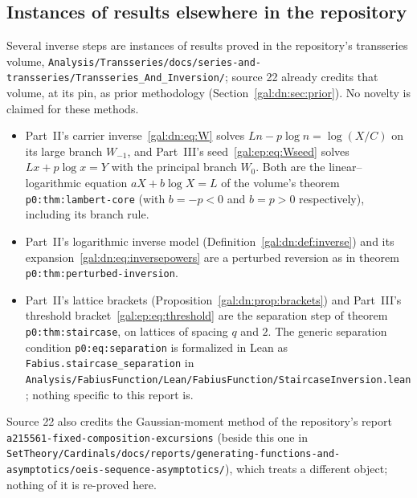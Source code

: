 \documentclass[11pt,letterpaper]{article}
\numberwithin{equation}{section}
\theoremstyle{definition}\newtheorem{definition}[theorem]{Definition}
\theoremstyle{remark}\newtheorem{remark}[theorem]{Remark}
\newcommand{\repopath}[1]{\nolinkurl{#1}}
\begin{document}
\subsection*{Instances of results elsewhere in the repository}
\label{gal:guide:lambert}
Several inverse steps are instances of results proved in the repository's transseries volume, \repopath{Analysis/Transseries/docs/series-and-transseries/Transseries_And_Inversion/}; source 22 already credits that volume, at its pin, as prior methodology (Section~\ref{gal:dn:sec:prior}). No novelty is claimed for these methods.
\begin{itemize}
\item Part~II's carrier inverse~\eqref{gal:dn:eq:W} solves $Ln-p\log n=\log(X/C)$ on its large branch $W_{-1}$, and Part~III's seed~\eqref{gal:ep:eq:Wseed} solves $Lx+p\log x=Y$ with the principal branch $W_0$. Both are the linear--logarithmic equation $aX+b\log X=L$ of the volume's theorem \texttt{p0:thm:lambert-core} (with $b=-p<0$ and $b=p>0$ respectively), including its branch rule.
\item Part~II's logarithmic inverse model (Definition~\ref{gal:dn:def:inverse}) and its expansion~\eqref{gal:dn:eq:inversepowers} are a perturbed reversion as in theorem \texttt{p0:thm:perturbed-inversion}.
\item Part~II's lattice brackets (Proposition~\ref{gal:dn:prop:brackets}) and Part~III's threshold bracket~\eqref{gal:ep:eq:threshold} are the separation step of theorem \texttt{p0:thm:staircase}, on lattices of spacing $q$ and $2$. The generic separation condition \texttt{p0:eq:separation} is formalized in Lean as \texttt{Fabius.staircase\_separation} in \repopath{Analysis/FabiusFunction/Lean/FabiusFunction/StaircaseInversion.lean}; nothing specific to this report is.
\end{itemize}
Source 22 also credits the Gaussian-moment method of the repository's report \repopath{a215561-fixed-composition-excursions} (beside this one in \repopath{SetTheory/Cardinals/docs/reports/generating-functions-and-asymptotics/oeis-sequence-asymptotics/}), which treats a different object; nothing of it is re-proved here.
\end{document}
